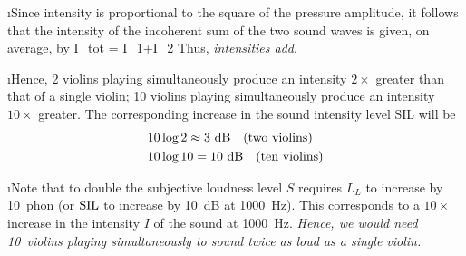 \i Since intensity is proportional to the
square of the pressure amplitude, it follows that the
intensity of the incoherent sum of the two sound waves
is given, on average, by
%
\be
I_{\rm tot} = I_1+I_2
\ee
%
Thus, {\em intensities add}.

\i Hence, 2 violins playing simultaneously produce
an intensity $2\times$ greater than that of a single
violin; 10 violins playing simultaneously produce
an intensity $10\times$ greater.
The corresponding increase in the sound intensity 
level SIL will be
%
\begin{align}
&10\log 2 \approx 3~{\rm dB}\quad({\rm two\ violins})
\\
&10\log 10 = 10~{\rm dB}\quad({\rm ten\ violins})
\end{align}
%

\i Note that to double the subjective loudness level $S$ 
requires $L_L$ to increase by 10~phon 
(or ${\rm SIL}$ to increase by 10~dB at 1000~Hz).
This corresponds to a $10\times$ increase in the intensity $I$ 
of the sound at 1000~Hz.
{\em Hence, we would need 10~violins playing 
simultaneously to sound twice as loud as a single violin.}

\ei
